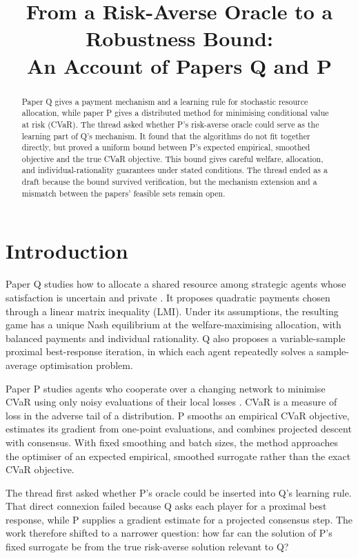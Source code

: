 \documentclass{article}
\title{From a Risk-Averse Oracle to a Robustness Bound:\\An Account of Papers Q and P}
\author{}
\date{}
\begin{document}
\maketitle

\begin{abstract}
Paper Q gives a payment mechanism and a learning rule for stochastic resource allocation, while paper P gives a distributed method for minimising conditional value at risk (CVaR).  The thread asked whether P's risk-averse oracle could serve as the learning part of Q's mechanism.  It found that the algorithms do not fit together directly, but proved a uniform bound between P's expected empirical, smoothed objective and the true CVaR objective.  This bound gives careful welfare, allocation, and individual-rationality guarantees under stated conditions.  The thread ended as a draft because the bound survived verification, but the mechanism extension and a mismatch between the papers' feasible sets remain open.
\end{abstract}

\section{Introduction}

Paper Q studies how to allocate a shared resource among strategic agents whose satisfaction is uncertain and private \cite{Q}.  It proposes quadratic payments chosen through a linear matrix inequality (LMI).  Under its assumptions, the resulting game has a unique Nash equilibrium at the welfare-maximising allocation, with balanced payments and individual rationality.  Q also proposes a variable-sample proximal best-response iteration, in which each agent repeatedly solves a sample-average optimisation problem.

Paper P studies agents who cooperate over a changing network to minimise CVaR using only noisy evaluations of their local losses \cite{P}.  CVaR is a measure of loss in the adverse tail of a distribution.  P smooths an empirical CVaR objective, estimates its gradient from one-point evaluations, and combines projected descent with consensus.  With fixed smoothing and batch sizes, the method approaches the optimiser of an expected empirical, smoothed surrogate rather than the exact CVaR objective.

The thread first asked whether P's oracle could be inserted into Q's learning rule.  That direct connexion failed because Q asks each player for a proximal best response, while P supplies a gradient estimate for a projected consensus step.  The work therefore shifted to a narrower question: how far can the solution of P's fixed surrogate be from the true risk-averse solution relevant to Q?
\end{document}
